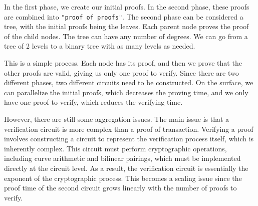  In the first phase, we create our initial proofs.
 In the second phase, these proofs are combined into \verb|"proof of proofs"|. 
 The second phase can be considered a tree, with the initial proofs being the leaves. Each parent node proves the proof of the child nodes.
 The tree can have any number of degrees. We can go from a tree of 2 levels to a binary tree with as many levels as needed.
 
 This is a simple process. Each node has its proof, and then we prove that the other proofs are valid, giving us only one proof
 to verify. Since there are two different phases, two different circuits need to be constructed.
 On the surface, we can parallelize the initial proofs, which decreases the proving time, and we only have one proof to verify, which reduces the verifying time.
 
 However, there are still some aggregation issues.
 The main issue is that a verification circuit is more complex than a proof of transaction.
 Verifying a proof involves constructing a circuit to represent the verification process itself, which is inherently complex. 
 This circuit must perform cryptographic operations, including curve arithmetic and bilinear pairings, which must be implemented directly at the circuit level. 
 As a result, the verification circuit is essentially the exponent of the cryptographic process.
 This becomes a scaling issue since the proof time of the second circuit grows linearly with the number of proofs to verify. \cite{Nova23}

